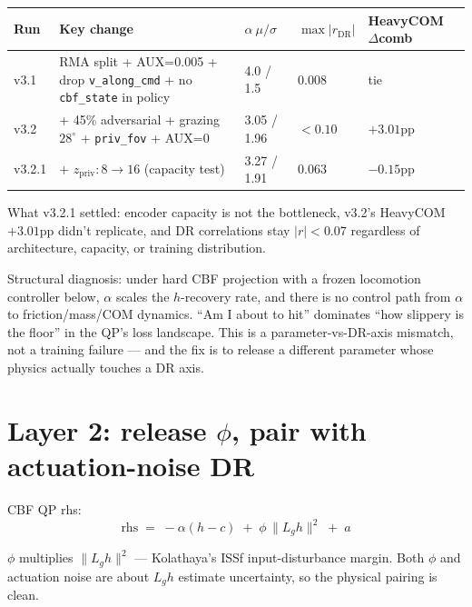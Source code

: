 \documentclass[11pt]{article}
\begin{document}
\begin{center}
\begin{tabular}{@{}l p{2.2in} l l l@{}}
\toprule
Run & Key change & $\alpha\ \mu/\sigma$ & $\max |r_{\text{DR}}|$ & HeavyCOM $\Delta$comb \\
\midrule
v3.1   & RMA split + AUX=0.005 + drop \texttt{v\_along\_cmd} + no \texttt{cbf\_state} in policy & 4.0 / 1.5  & 0.008 & tie \\
v3.2   & + 45\% adversarial + grazing $28^\circ$ + \texttt{priv\_fov} + AUX=0                  & 3.05 / 1.96 & $<0.10$ & $+3.01$pp \\
v3.2.1 & + $z_{\text{priv}}: 8 \to 16$ (capacity test)                                           & 3.27 / 1.91 & 0.063 & $-0.15$pp \\
\bottomrule
\end{tabular}
\end{center}

What v3.2.1 settled: encoder capacity is not the bottleneck, v3.2's HeavyCOM $+3.01$pp didn't replicate, and DR correlations stay $|r| < 0.07$ regardless of architecture, capacity, or training distribution.

Structural diagnosis: under hard CBF projection with a frozen locomotion controller below, $\alpha$ scales the $h$-recovery rate, and there is no control path from $\alpha$ to friction/mass/COM dynamics. ``Am I about to hit'' dominates ``how slippery is the floor'' in the QP's loss landscape. This is a parameter-vs-DR-axis mismatch, not a training failure --- and the fix is to release a different parameter whose physics actually touches a DR axis.

\section*{Layer 2: release $\phi$, pair with actuation-noise DR}

CBF QP rhs:
\begin{equation}
\text{rhs} \;=\; -\alpha(h - c) \;+\; \phi \,\|L_g h\|^2 \;+\; a
\end{equation}

$\phi$ multiplies $\|L_g h\|^2$ --- Kolathaya's ISSf input-disturbance margin. Both $\phi$ and actuation noise are about $L_g h$ estimate uncertainty, so the physical pairing is clean.
\end{document}
